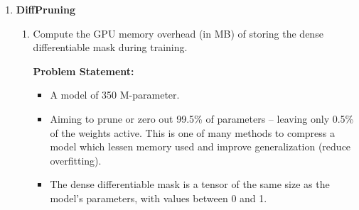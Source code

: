 \documentclass[11pt]{article}
\begin{document}
\begin{enumerate}[label=(\alph*)]
\begin{enumerate}[label=(\roman*)]
        \textbf{Answer:}
        \begin{itemize}
            \item Total weights: 4 million parameters.
            \item Budget: 0.8\% of total weights = 32,000 weights = \(k\).
            \item A binary mask \(\mathbf{m} \in \{0, 1\}^n\) has 32,000 ones and the rest zeros. (\(m_i = 1\): update; \(m_i = 0\): freeze).
            \item Mapping formula (using both \(\mathbf{I}\) and \(\mathbf{m}\)): \(\mathbf{M} = \mathbf{I}^T \mathbf{m}\).
            \item Mapping formula (constructing \(\mathbf{m}\) from top-\(k\)): \(\mathbf{m} = \mathbf{I} > \min(\operatorname{Top}_k(\mathbf{I}))\).
        \end{itemize}

        \item To update the selected weights, the Adam optimizer requires memory for more than just the weights themselves.
        For each trainable parameter, memory must be allocated for its \textbf{gradient}, its \textbf{1st moment}, and its \textbf{2nd moment}.
        Assuming all values are stored in 32-bit float precision (4 bytes per number), what is the total memory overhead for the optimizer?

        \textbf{Answer:} 
        \begin{itemize}
            \item Total memory for weights: 0.8\% of \(4.0 \times 10^6 \text{ weights} \times 3 \text{ stages} \times 4 \text{ bytes} = 375 \text{ MB}\). 
        \end{itemize}
    \end{enumerate}


    \item \textbf{DiffPruning}
    
    \begin{enumerate}[label=(\roman*)]
        \item Compute the GPU memory overhead (in MB) of storing the dense differentiable mask during training.
        
        \textbf{Problem Statement:}
        \begin{itemize}
            \item A model of 350 M-parameter.
            \item Aiming to prune or zero out 99.5\% of parameters -- leaving only 0.5\% of the weights active.
            This is one of many methods to compress a model which lessen memory used and improve generalization (reduce overfitting).
            \item The dense differentiable mask is a tensor of the same size as the model's parameters, with values between 0 and 1.
        \end{itemize}


\end{enumerate}
\end{enumerate}
\end{document}
